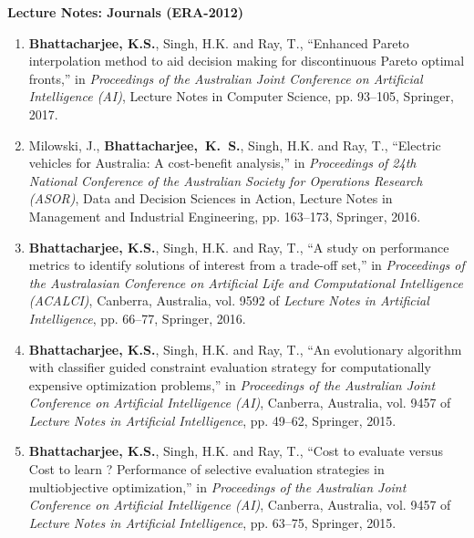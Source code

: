 \documentclass[10pt]{article}
\begin{document}
\noindent\textbf{Lecture Notes: Journals (ERA-2012)}

\begin{enumerate}[itemsep = 0em]
\setcounter{enumi}{0}

\item \textbf{Bhattacharjee, K.S.}, {Singh, H.K.} and {Ray, T.}, ``Enhanced Pareto interpolation method to aid decision
making for discontinuous Pareto optimal fronts,'' in {\em Proceedings of the Australian Joint Conference on Artificial Intelligence (AI)}, Lecture Notes in Computer Science, pp. 93--105, Springer, 2017.

\item Milowski, J., \textbf{Bhattacharjee,~K.~S.}, Singh, H.K. and Ray, T., ``Electric vehicles for Australia: A cost-benefit analysis,” in {\em Proceedings of 24th National Conference of the Australian Society for Operations Research (ASOR)}, Data and Decision Sciences in Action, Lecture Notes in Management and Industrial Engineering, pp. 163--173, Springer, 2016.

\item \textbf{Bhattacharjee, K.S.}, {Singh, H.K.} and {Ray, T.}, ``A study on performance metrics to identify solutions of interest from a trade-off set,'' in {\em Proceedings of the Australasian
Conference on Artificial Life and Computational Intelligence (ACALCI)}, Canberra, Australia, vol. 9592 of {\em Lecture Notes in Artificial Intelligence}, pp. 66--77, Springer, 2016.

\item \textbf{Bhattacharjee, K.S.}, {Singh, H.K.} and {Ray, T.}, ``An evolutionary algorithm with classifier guided constraint evaluation strategy for computationally expensive optimization
problems,'' in {\em Proceedings of the Australian Joint Conference on Artificial Intelligence (AI)}, Canberra, Australia, vol. 9457 of {\em Lecture Notes in Artificial Intelligence}, pp. 49--62, Springer, 2015.

\item \textbf{Bhattacharjee, K.S.}, {Singh, H.K.} and {Ray, T.}, ``Cost to evaluate versus Cost to learn ? Performance of selective evaluation strategies in multiobjective optimization,'' in {\em Proceedings of the Australian Joint Conference on Artificial Intelligence (AI)}, Canberra, Australia, vol. 9457 of {\em Lecture Notes in Artificial Intelligence}, pp. 63--75, Springer, 2015.

\end{enumerate}
\end{document}
